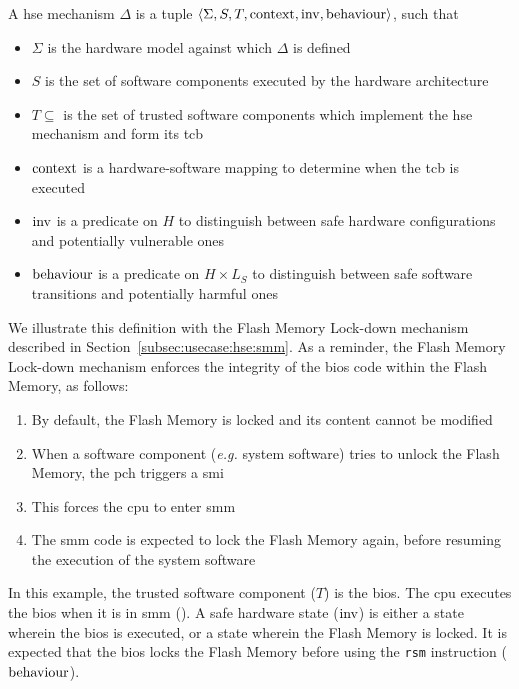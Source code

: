 \begin{definition}
  \label{def:speccert:hse}
  A \ac{hse} mechanism $\Delta$ is a tuple
  $\langle \Sigma, S, T, \mathrm{context}, \mathrm{inv}, \mathrm{behaviour} \rangle$,
  such that
  \begin{itemize}
  \item $\Sigma$ is the hardware model against which $\Delta$ is defined
  \item $S$ is the set of software components executed by the hardware
    architecture
  \item $T \subseteq$ is the set of trusted software components which implement
    the \ac{hse} mechanism and form its \ac{tcb}
  \item $\mathrm{context}$ is a hardware-software mapping to determine when the
    \ac{tcb} is executed
  \item $\mathrm{inv}$ is a predicate on $H$ to distinguish between safe hardware
    configurations and potentially vulnerable ones
  \item $\mathrm{behaviour}$ is a predicate on $H \times L_S$ to distinguish
    between safe software transitions and potentially harmful ones
  \end{itemize}
\end{definition}

We illustrate this definition with the Flash Memory Lock-down mechanism
described in Section~\ref{subsec:usecase:hse:smm}.
%
As a reminder, the Flash Memory Lock-down mechanism enforces the integrity of
the \ac{bios} code within the Flash Memory, as follows:
%
\begin{enumerate}
\item By default, the Flash Memory is locked and its content cannot be modified
%
\item When a software component (\emph{e.g.} system software) tries to unlock
  the Flash Memory, the \ac{pch} triggers a \ac{smi}
%
\item This forces the \ac{cpu} to enter \ac{smm}
%
\item The \ac{smm} code is expected to lock the Flash Memory again, before
  resuming the execution of the system software
\end{enumerate}

\begin{example}
  \label{example:speccert:flashdef}
  In this example, the trusted software component ($T$) is the \ac{bios}.
  The \ac{cpu} executes the \ac{bios} when it is in \ac{smm} ().
  A safe hardware state ($\mathrm{inv}$) is either a state wherein the \ac{bios}
  is executed, or a state wherein the Flash Memory is locked.
  It is expected that the \ac{bios} locks the Flash Memory before using the
  \texttt{rsm} instruction ($\mathrm{behaviour}$).
\end{example}

